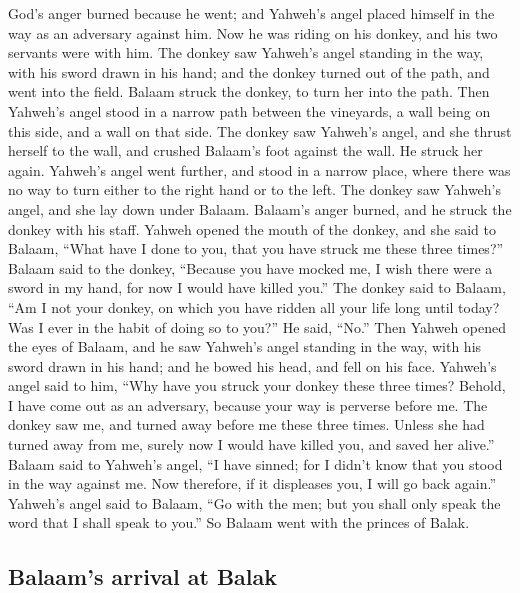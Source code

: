  God's anger burned because he went; and Yahweh's angel
placed himself in the way as an adversary against him. Now he was riding
on his donkey, and his two servants were with him.  The
donkey saw Yahweh's angel standing in the way, with his sword drawn in
his hand; and the donkey turned out of the path, and went into the
field. Balaam struck the donkey, to turn her into the path.
 Then Yahweh's angel stood in a narrow path between the
vineyards, a wall being on this side, and a wall on that side.
 The donkey saw Yahweh's angel, and she thrust herself to
the wall, and crushed Balaam's foot against the wall. He struck her
again.  Yahweh's angel went further, and stood in a
narrow place, where there was no way to turn either to the right hand or
to the left.  The donkey saw Yahweh's angel, and she lay
down under Balaam. Balaam's anger burned, and he struck the donkey with
his staff.  Yahweh opened the mouth of the donkey, and
she said to Balaam, ``What have I done to you, that you have struck me
these three times?''  Balaam said to the donkey,
``Because you have mocked me, I wish there were a sword in my hand, for
now I would have killed you.''  The donkey said to
Balaam, ``Am I not your donkey, on which you have ridden all your life
long until today? Was I ever in the habit of doing so to you?'' He said,
``No.''  Then Yahweh opened the eyes of Balaam, and he
saw Yahweh's angel standing in the way, with his sword drawn in his
hand; and he bowed his head, and fell on his face. 
Yahweh's angel said to him, ``Why have you struck your donkey these
three times? Behold, I have come out as an adversary, because your way
is perverse before me.  The donkey saw me, and turned
away before me these three times. Unless she had turned away from me,
surely now I would have killed you, and saved her alive.''
 Balaam said to Yahweh's angel, ``I have sinned; for I
didn't know that you stood in the way against me. Now therefore, if it
displeases you, I will go back again.''  Yahweh's angel
said to Balaam, ``Go with the men; but you shall only speak the word
that I shall speak to you.'' So Balaam went with the princes of Balak.

\hypertarget{balaams-arrival-at-balak}{%
\subsection{Balaam's arrival at Balak}\label{balaams-arrival-at-balak}}

